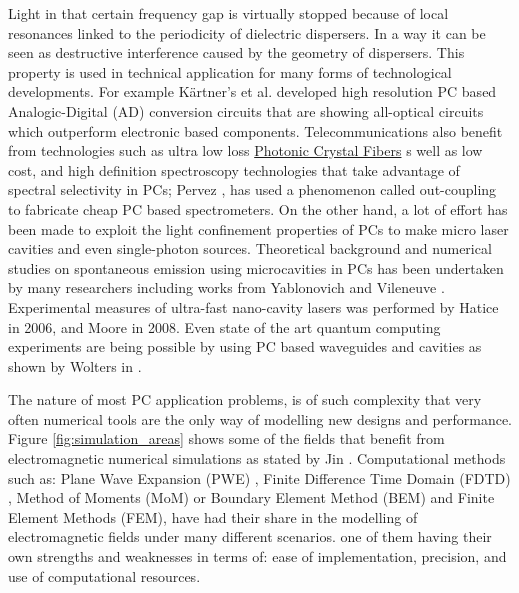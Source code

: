 Light in that certain frequency gap is virtually stopped because of local resonances linked to the periodicity of dielectric dispersers. In a way it can be seen as destructive interference caused by the geometry of dispersers. This property is used in technical application for many forms of technological developments. For example K\"{a}rtner's et al. developed high resolution PC based Analogic-Digital (AD) conversion circuits \cite{F.X.Kaertner2006}\add[SEC]{,} that are showing all-optical circuits which outperform electronic based components. Telecommunications also benefit from technologies such as ultra low loss \href{http://en.wikipedia.org/wiki/Photonic-crystal_fiber}{Photonic Crystal Fibers} \cite{A.M.Apetrei2005}s well as low cost, and high definition spectroscopy technologies that take advantage of spectral selectivity in PCs; Pervez \cite{Pervez2010}, has used a phenomenon called out-coupling to fabricate cheap PC based spectrometers. On the other hand, a lot of effort has been made to exploit the light confinement properties of PCs to make micro laser cavities and even single-photon sources. Theoretical background and numerical studies on spontaneous emission using microcavities in PCs has been undertaken by many researchers including works from Yablonovich and Vileneuve \cite{Yablonovich1987,Yablonovich1991,Villeneuve1996}. Experimental measures of ultra-fast nano-cavity lasers was performed by Hatice \cite{Altug2006} in 2006, and Moore \cite{Moore2008} in 2008. Even state of the art quantum computing experiments are being possible by using PC based waveguides and cavities as shown by Wolters in \cite{Wolters2010}.

The nature of most PC application problems, is of such complexity that very often numerical tools are the only way of modelling new designs and performance. Figure \ref{fig:simulation_areas} shows some of the fields that benefit from electromagnetic numerical simulations as stated by Jin \cite{Jin2010}.  Computational methods such as: Plane Wave Expansion (PWE) \cite{StevenG.Johnson2001,Loaiza2011},  Finite Difference Time Domain (FDTD) \cite{A.M.Apetrei2005,Oskooi2009}, Method of Moments (MoM) or Boundary Element Method (BEM) and Finite Element Methods (FEM)\cite{Rodriguez2005,Masanori2001}, have had their share in the modelling of electromagnetic fields under many different scenarios.  one of them having their own strengths and weaknesses in terms of: ease of implementation, precision, and use of computational resources.

